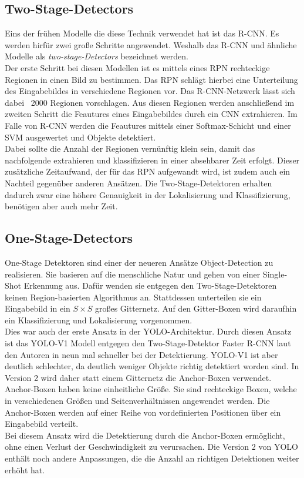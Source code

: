 \subsection{Two-Stage-Detectors}

Eins der frühen Modelle die diese Technik verwendet hat ist das \ac{R-CNN}. Es werden hirfür zwei große Schritte angewendet. Weshalb das \ac{R-CNN} und ähnliche Modelle als \textit{two-stage-Detectors} bezeichnet werden.\\
Der erste Schritt bei diesen Modellen ist es mittels eines \ac{RPN} rechteckige Regionen in einen Bild zu bestimmen.
Das \ac{RPN} schlägt hierbei eine Unterteilung des Eingabebildes in verschiedene Regionen vor. Das \ac{R-CNN}-Netzwerk lässt sich dabei ~2000 Regionen vorschlagen.
Aus diesen Regionen werden anschließend im zweiten Schritt die Feautures eines Eingabebildes durch ein \ac{CNN} extrahieren. Im Falle von \ac{R-CNN} werden die Feautures mittels einer Softmax-Schicht und einer \ac{SVM} ausgewertet und Objekte detektiert.\\
Dabei sollte die Anzahl der Regionen vernünftig klein sein, damit das nachfolgende extrahieren und klassifizieren in einer absehbarer Zeit erfolgt. Dieser zusätzliche Zeitaufwand, der für das \ac{RPN} aufgewandt wird, ist zudem auch ein Nachteil gegenüber anderen Ansätzen. Die Two-Stage-Detektoren erhalten dadurch zwar eine höhere Genauigkeit in der Lokalisierung und Klassifizierung, benötigen aber auch mehr Zeit.\cite{R_CNN}

\subsection{One-Stage-Detectors}

One-Stage Detektoren sind einer der neueren Ansätze Object-Detection zu realisieren.
Sie basieren auf die menschliche Natur und gehen von einer Single-Shot Erkennung aus. Dafür wenden sie entgegen den Two-Stage-Detektoren keinen Region-basierten Algorithmus an.
Stattdessen unterteilen sie ein Eingabebild in ein $S \times  S$ großes Gitternetz. Auf den Gitter-Boxen wird daraufhin ein Klassifizierung und Lokalisierung vorgenommen.\\
Dies war auch der erste Ansatz in der \ac{YOLO}-Architektur. Durch diesen Ansatz ist das \ac{YOLO}-V1 Modell entgegen den Two-Stage-Detektor Faster \ac{R-CNN} laut den Autoren in \cite{YOLO_V3} neun mal schneller bei der Detektierung. \ac{YOLO}-V1 ist aber deutlich schlechter, da deutlich weniger Objekte richtig detektiert worden sind. In Version 2 wird daher statt einem Gitternetz die Anchor-Boxen verwendet. Anchor-Boxen haben keine einheitliche Größe. Sie sind rechteckige Boxen, welche in verschiedenen Größen und Seitenverhältnissen angewendet werden. Die Anchor-Boxen werden auf einer Reihe von vordefinierten Positionen über ein Eingabebild verteilt.\\
Bei diesem Ansatz wird die Detektierung durch die Anchor-Boxen ermöglicht, ohne einen Verlust der Geschwindigkeit zu verursachen. Die Version 2 von \ac{YOLO} enthält noch andere Anpassungen, die die Anzahl an richtigen Detektionen weiter erhöht hat.
\cite{YOLO_V3}

